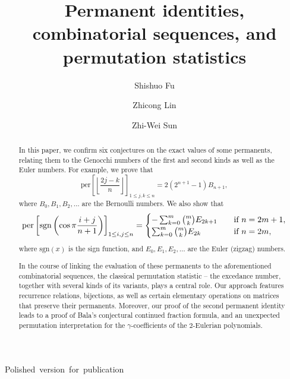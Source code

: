 \documentclass[11pt,reqno]{amsart}
\numberwithin{equation}{section}
\theoremstyle{plain}
\theoremstyle{definition}
\def\per{\mathrm{per}}
\def\sgn{\mathrm{sgn}}
\def\per{{\rm per}}
\begin{document}
\hbox{Polished version for publication}
\medskip

\title{Permanent identities, combinatorial sequences, and permutation statistics}

\author[S. Fu]{Shishuo Fu}
\address[Shishuo Fu]{College of Mathematics and Statistics, Chongqing University, Huxi campus, Chongqing 401331, P.R. China}

\author[Z. Lin]{Zhicong Lin}
\address[Zhicong Lin]{Research Center for Mathematics and Interdisciplinary Sciences, Shandong University \& Frontiers Science Center for Nonlinear Expectations, Ministry of Education, Qingdao 266237, P.R. China}

\author[Z.-W. Sun]{Zhi-Wei Sun}
\address[Zhi-Wei Sun, corresponding author]{School of Mathematics, Nanjing University, Nanjing 210093, P.R. China}


\begin{abstract}
In this paper, we confirm six conjectures on the exact values of some permanents, relating them to the Genocchi numbers of the first and second kinds as well as the Euler numbers. For example, we prove that
$$\mathrm{per}\left[\left\lfloor\frac{2j-k}{n}\right\rfloor\right]_{1\le j,k\le n}=2(2^{n+1}-1)B_{n+1},$$
where $B_0,B_1,B_2,\ldots$ are the Bernoulli numbers.
We also show that
$$
\per\left[\sgn\left(\cos\pi\frac{i+j}{n+1}\right)\right]_{1\le i,j\le n}=\begin{cases}
-\sum_{k=0}^m\binom{m}{k}E_{2k+1}&\quad\text{if $n=2m+1$},\\
\sum_{k=0}^m\binom{m}{k}E_{2k}&\quad\text{if $n=2m$},
\end{cases}
$$
where $\sgn(x)$ is the sign function, and $E_0,E_1,E_2,\ldots$ are the Euler (zigzag) numbers.

 In the course of linking the evaluation of these permanents to the aforementioned combinatorial sequences, the classical permutation statistic -- the excedance number, together with several kinds of its variants, plays a central role. Our approach features recurrence relations, bijections, as well as certain elementary operations on matrices that preserve their permanents. Moreover, our proof of the second permanent identity leads to  a proof of Bala's conjectural continued fraction formula, and an unexpected permutation interpretation for the $\gamma$-coefficients of the $2$-Eulerian polynomials.

\end{abstract}
\end{document}
